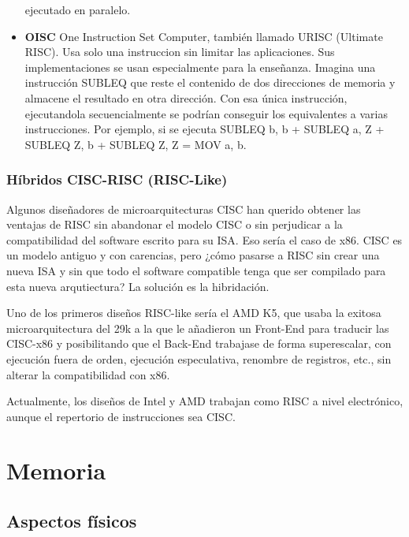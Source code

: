 \documentclass[a4paper, 11pt, titlepage]{article}
\begin{document}
\begin{itemize}
                ejecutado en paralelo.
                \item \textbf{OISC} One Instruction Set Computer, también llamado URISC (Ultimate RISC). Usa solo una instruccion 
                sin limitar las aplicaciones. Sus implementaciones se usan especialmente para la enseñanza. Imagina una instrucción 
                SUBLEQ que reste el contenido de dos direcciones de memoria y almacene el resultado en otra dirección. Con esa única 
                instrucción, ejecutandola secuencialmente se podrían conseguir los equivalentes a varias instrucciones. Por ejemplo, 
                si se ejecuta SUBLEQ b, b + SUBLEQ a, Z + SUBLEQ Z, b + SUBLEQ Z, Z = MOV a, b.            
            \end{itemize}

        \subsubsection{Híbridos CISC-RISC (RISC-Like)}

            Algunos diseñadores de microarquitecturas CISC han querido obtener las ventajas de RISC sin abandonar el modelo CISC o sin 
            perjudicar a la compatibilidad del software escrito para su ISA. Eso sería el caso de x86. CISC es un modelo antiguo y con 
            carencias, pero ¿cómo pasarse a RISC sin crear una nueva ISA y sin que todo el software compatible tenga que ser compilado 
            para esta nueva arqutiectura? La solución es la hibridación.

            Uno de los primeros diseños RISC-like sería el AMD K5, que usaba la exitosa microarquitectura del 29k a la que le añadieron 
            un Front-End para traducir las CISC-x86 y posibilitando que el Back-End trabajase de forma superescalar, con ejecución fuera 
            de orden, ejecución especulativa, renombre de registros, etc., sin alterar la compatibilidad con x86.

            Actualmente, los diseños de Intel y AMD trabajan como RISC a nivel electrónico, aunque el repertorio de instrucciones sea 
            CISC.

\section{Memoria}\label{memoria}

    \subsection{Aspectos físicos}
\end{document}

